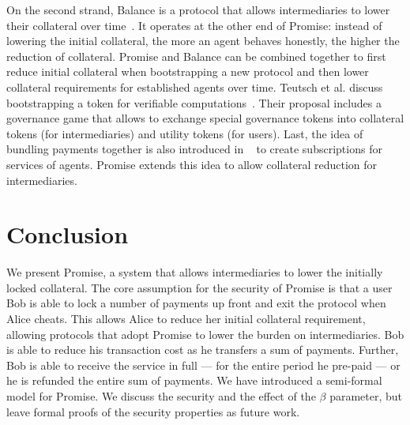 \documentclass[runningheads]{llncs}
\newcommand{\sys}{Promise\xspace}
\newcommand{\todom}[1]{\todo[linecolor=green,backgroundcolor=green!25,bordercolor=green,inline,caption={}]{Todo for Dominik: #1}}
\begin{document}
On the second strand, Balance is a protocol that allows intermediaries to lower their collateral over time~\cite{Harz2019Balance}.
It operates at the other end of \sys: instead of lowering the initial collateral, the more an agent behaves honestly, the higher the reduction of collateral.
\sys and Balance can be combined together to first reduce initial collateral when bootstrapping a new protocol and then lower collateral requirements for established agents over time.
Teutsch et al. discuss bootstrapping a token for verifiable computations~\cite{Teutsch2019Boostrap}.
Their proposal includes a governance game that allows to exchange special governance tokens into collateral tokens (for intermediaries) and utility tokens (for users).
Last, the idea of bundling payments together is also introduced in ~\cite{Berg2018} to create subscriptions for services of agents.
\sys extends this idea to allow collateral reduction for intermediaries.



\section{Conclusion}
\label{sec:conclusion}

We present \sys, a system that allows intermediaries to lower the initially locked collateral.
The core assumption for the security of \sys is that a user Bob is able to lock a number of payments up front and exit the protocol when Alice cheats.
This allows Alice to reduce her initial collateral requirement, allowing protocols that adopt \sys to lower the burden on intermediaries.
Bob is able to reduce his transaction cost as he transfers a sum of payments.
Further, Bob is able to receive the service in full --- for the entire period he pre-paid --- or he is refunded the entire sum of payments.
We have introduced a semi-formal model for \sys.
We discuss the security and the effect of the $\beta$ parameter, but leave formal proofs of the security properties as future work.




\end{document}

